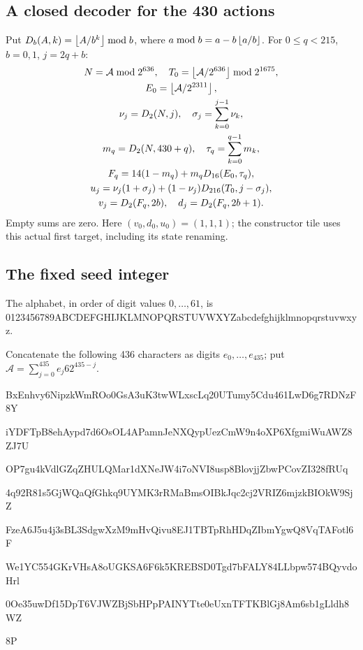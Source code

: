 \subsection*{A closed decoder for the 430 actions}
Put $D_b(A,k)=\left\lfloor A/b^k\right\rfloor\bmod b$, where
$a\bmod b=a-b\left\lfloor a/b\right\rfloor$. For $0\le q<215$, $b=0,1$, $j=2q+b$:
\[
\begin{gathered}
N=\mathcal A\bmod2^{636},\quad
T_0=\left\lfloor\mathcal A/2^{636}\right\rfloor\bmod2^{1675},\\
E_0=\left\lfloor\mathcal A/2^{2311}\right\rfloor,\\
\nu_j=D_2(N,j),\quad \sigma_j=\sum_{k=0}^{j-1}\nu_k,\\
m_q=D_2(N,430+q),\quad \tau_q=\sum_{k=0}^{q-1}m_k,\\
F_q=14(1-m_q)+m_qD_{16}(E_0,\tau_q),\\
u_j=\nu_j(1+\sigma_j)+(1-\nu_j)D_{216}(T_0,j-\sigma_j),\\
v_j=D_2(F_q,2b),\quad d_j=D_2(F_q,2b+1).
\end{gathered}
\]
Empty sums are zero. Here $(v_0,d_0,u_0)=(1,1,1)$; the constructor tile
uses this actual first target, including its state renaming.

\subsection*{The fixed seed integer}
The alphabet, in order of digit values $0,\ldots,61$, is
{\fontsize{7.7}{8.2}\selectfont\ttfamily 0123456789ABCDEFGHIJKLMNOPQRSTUVWXYZabcdefghijklmnopqrstuvwxyz}.\par
Concatenate the following 436 characters as digits $e_0,\ldots,e_{435}$;
put $\mathcal A=\sum_{j=0}^{435}e_j62^{435-j}$.\par
\noindent\begin{minipage}{\linewidth}
\fontsize{7.7}{8.2}\selectfont\ttfamily\setlength{\parskip}{0pt}
BxEnhvy6NipzkWmROo0GsA3uK3twWLxscLq20UTumy5Cdu461LwD6g7RDNzF8Y\par
iYDFTpB8ehAypd7d6OsOL4APamnJeNXQypUezCmW9n4oXP6XfgmiWuAWZ8ZJ7U\par
OP7gu4kVdlGZqZHULQMar1dXNeJW4i7oNVI8usp8BlovjjZbwPCovZI328fRUq\par
4q92R81s5GjWQaQfGhkq9UYMK3rRMaBmsOIBkJqc2cj2VRIZ6mjzkBIOkW9SjZ\par
FzeA6J5u4j3sBL3SdgwXzM9mHvQivu8EJ1TBTpRhHDqZIbmYgwQ8VqTAFotl6F\par
We1YC554GKrVHsA8oUGKSA6F6k5KREBSD0Tgd7bFALY84LLbpw574BQyvdoHrl\par
0Oe35uwDf15DpT6VJWZBjSbHPpPAINYTte0eUxnTFTKBlGj8Am6sb1gLldh8WZ\par
8P\par
\end{minipage}

